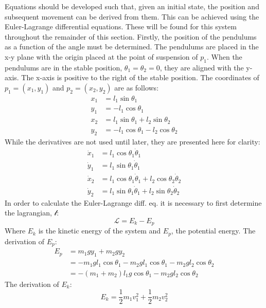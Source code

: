 Equations should be developed such that, given an initial state, the position and subsequent movement can be derived from them.
This can be achieved using the Euler-Lagrange differential equations.
These will be found for this system throughout the remainder of this section.
Firstly, the position of the pendulums as a function of the angle must be determined.
The pendulums are placed in the x-y plane with the origin placed at the point of suspension of $p_1$.
When the pendulums are in the stable position, $\theta_1=\theta_2=0$, they are aligned with the y-axis.
The x-axis is positive to the right of the stable position.
The coordinates of $p_1=(x_1,y_1)$ and $p_2=(x_2,y_2)$ are as follows:
\begin{align}
	x_1 &= l_1\sin{\theta_1}\\
	y_1 &= -l_1\cos{\theta_1}\\
	x_2 &= l_1\sin{\theta_1} + l_2\sin{\theta_2}\\
	y_2 &= -l_1\cos{\theta_1} - l_2\cos{\theta_2}
\end{align}
While the derivatives are not used until later, they are presented here for clarity:
\begin{align}
	\dot{x}_1 &= l_1\cos{\theta}_1\dot{\theta}_1\\
	\dot{y}_1 &= l_1\sin{\theta}_1\dot{\theta}_1\\
	\dot{x}_2 &= l_1\cos{\theta}_1\dot{\theta}_1 + l_2\cos{\theta_2}\dot{\theta}_2\\
	\dot{y}_2 &= l_1\sin{\theta}_1\dot{\theta}_1 + l_2\sin{\theta_2}\dot{\theta}_2
\end{align}
In order to calculate the Euler-Lagrange diff. eq. it is necessary to first determine the lagrangian, $\mathcal{l}$:
\begin{equation}
	\mathcal{L}=E_k-E_p
\end{equation}
Where $E_k$ is the kinetic energy of the system and $E_p$, the potential energy.
The derivation of $E_p$:
\begin{align}
	E_p &= m_1 g y_1 + m_2 g y_2\\
		&= -m_1 g l_1 \cos{\theta_1} - m_2 g l_1 \cos{\theta_1} - m_2 g l_2 \cos{\theta_2}\\
		&= -(m_1+m_2)l_1g \cos{\theta_1}-m_2 g l_2 \cos{\theta_2}
		\label{eq:ep}
\end{align}
The derivation of $E_k$:
\begin{equation}
	\label{eq:ek}
	E_k = \frac{1}{2}m_1v_1^2+\frac{1}{2}m_2v_2^2
\end{equation}
